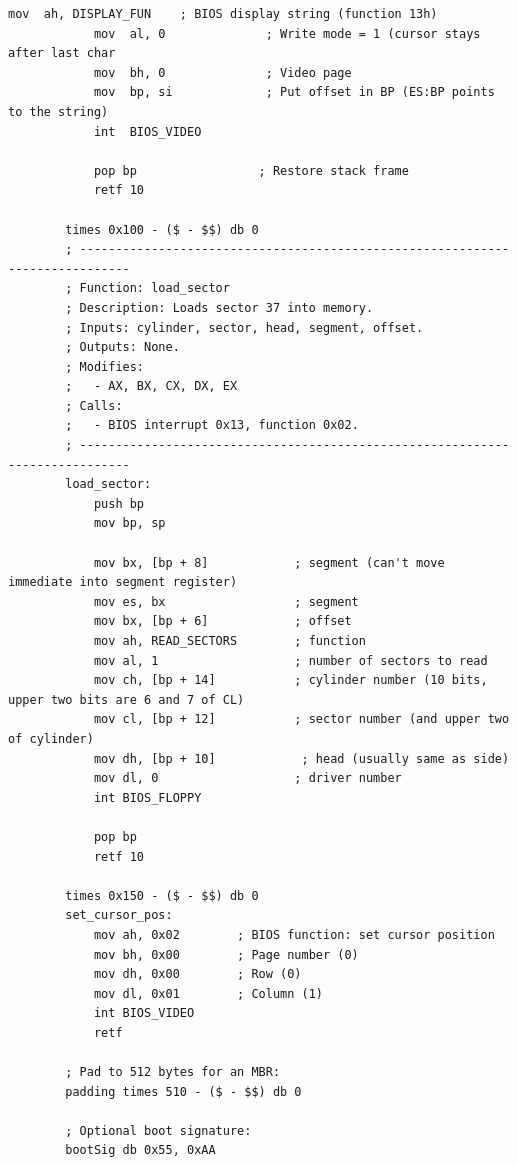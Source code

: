 \documentclass{article}
\begin{document}
\begin{lstlisting}[caption={os623V03.asm listing}, captionpos=t]
            mov  ah, DISPLAY_FUN    ; BIOS display string (function 13h)
            mov  al, 0              ; Write mode = 1 (cursor stays after last char
            mov  bh, 0              ; Video page
            mov  bp, si             ; Put offset in BP (ES:BP points to the string)
            int  BIOS_VIDEO

            pop bp                 ; Restore stack frame
            retf 10

        times 0x100 - ($ - $$) db 0
        ; -----------------------------------------------------------------------------
        ; Function: load_sector
        ; Description: Loads sector 37 into memory.
        ; Inputs: cylinder, sector, head, segment, offset.
        ; Outputs: None.
        ; Modifies:
        ;   - AX, BX, CX, DX, EX
        ; Calls:
        ;   - BIOS interrupt 0x13, function 0x02.
        ; -----------------------------------------------------------------------------
        load_sector:
            push bp
            mov bp, sp

            mov bx, [bp + 8]            ; segment (can't move immediate into segment register)
            mov es, bx                  ; segment
            mov bx, [bp + 6]            ; offset
            mov ah, READ_SECTORS        ; function
            mov al, 1                   ; number of sectors to read
            mov ch, [bp + 14]           ; cylinder number (10 bits, upper two bits are 6 and 7 of CL)
            mov cl, [bp + 12]           ; sector number (and upper two of cylinder)
            mov dh, [bp + 10]            ; head (usually same as side)
            mov dl, 0                   ; driver number
            int BIOS_FLOPPY

            pop bp
            retf 10

        times 0x150 - ($ - $$) db 0
        set_cursor_pos:
            mov ah, 0x02        ; BIOS function: set cursor position
            mov bh, 0x00        ; Page number (0)
            mov dh, 0x00        ; Row (0)
            mov dl, 0x01        ; Column (1)
            int BIOS_VIDEO
            retf

        ; Pad to 512 bytes for an MBR:
        padding times 510 - ($ - $$) db 0

        ; Optional boot signature:
        bootSig db 0x55, 0xAA

    \end{lstlisting}
\end{document}
